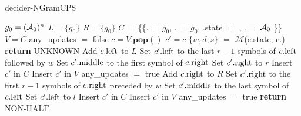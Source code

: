 \begin{algorithm}
    \caption{{\sc decider-NGramCPS}}\label{alg:NGramCPS}

    \begin{algorithmic}[1]

        \State $g_0 = (\mathcal{A}_0)^n$ 
        \State $L = \{ g_0 \}$ 
        \State $R = \{ g_0 \}$ 
        \State $C =$ \{\{.\leftngram $=$ $g_0$, .\rightngram $=$ $g_0$, .state $=$ \stateA, .\middlesymbol $=$ $\mathcal{A}_0$ \}\} 
        \label{alg:NGramCPS:line:whileTrue}
        \State $V = C$
        \State any\_updates $=$ false
        \State $c = V.\textbf{pop}()$
        \State $c' = c$
        \State $\{w,d,s\}$ $=$ $\mathcal{M}$(c.state, c.\middlesymbol) 
        \State {} 
        \State \textbf{return} UNKNOWN\label{alg:NGramCPS:line:unknown}
        \EndIf
        \State {}
        \State Add $c.\text{left}$ to $L$ \label{alg:NGramCPS:line:insertL}
        \State Set $c'.\text{left}$ to the last $r-1$ symbols of $c.\text{left}$ followed by $w$
        \State Set $c'.\text{middle}$ to the first symbol of $c.\text{right}$
        \State Set $c'.\text{right}$ to $r$
        \State \tabi Insert $c'$ in $C$ \label{alg:NGramCPS:line:insertInConfSet}
        \State \tabi Insert $c'$ in $V$ \label{alg:NGramCPS:line:insertInConfSetToVisit}
        \State \tabi any\_updates $=$ true
        \EndIf
        \EndFor
        \EndIf
        \State {} \label{alg:NGramCPS:line:moveLeft}
        \State Add $c.\text{right}$ to $R$
        \State Set $c'.\text{right}$ to the first $r-1$ symbols of $c.\text{right}$ preceded by $w$
        \State Set $c'.\text{middle}$ to the last symbol of $c.\text{left}$
        \State Set $c'.\text{left}$ to $l$
        \State \tabi Insert $c'$ in $C$
        \State \tabi Insert $c'$ in $V$
        \State \tabi any\_updates $=$ true
        \EndIf
        \EndFor
        \EndIf
        \EndWhile
        \State {}
        \State \textbf{return} NON-HALT\label{alg:NGramCPS:line:non-halt} 
        \EndIf

        \EndWhile
    \end{algorithmic}
\end{algorithm}

